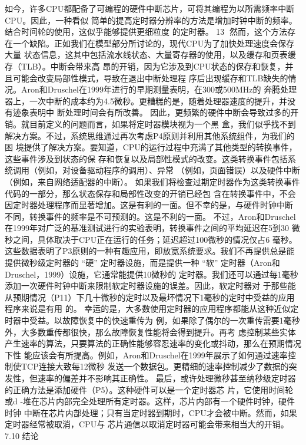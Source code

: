 如今，许多CPU都配备了可编程的硬件中断芯片，可将其编程为以所需频率中断CPU。因此，一种看似
简单的提高定时器分辨率的方法是增加时钟中断的频率。结合时间轮的使用，这似乎能够提供更细粒度
的定时器。
                                                                       13
然而，这个方法存在一个缺陷。正如我们在模型部分所讨论的，现代CPU为了加快处理速度会保存大量
状态信息，这其中包括流水线状态、大量寄存器的使用，以及缓存和页表缓存（TLB）。中断会带来高
昂的开销，因为它涉及到CPU状态的保存和恢复，并且可能会改变局部性模式，导致在退出中断处理程
序后出现缓存和TLB缺失的情况。Aron和Druschel在1999年进行的早期测量表明，在300或500MHz的
奔腾处理器上，一次中断的成本约为4.5微秒。更糟糕的是，随着处理器速度的提升，并没有迹象表明中
断处理时间会有所改善。
因此，更频繁的硬件中断会导致过多的开销。就目前定义的问题而言，如果将定时器模块视为一个黑
盒，我们似乎找不到解决方案。不过，系统思维通过再次考虑P4原则并利用其他系统组件，为我们的困
境提供了解决方案。要知道，CPU的运行过程中充满了其他类型的转换事件，这些事件涉及到状态的保
存和恢复以及局部性模式的改变。这类转换事件包括系统调用（例如，对设备驱动程序的调用）、异常
（例如，页面错误）以及硬件中断（例如，来自网络适配器的中断）。
如果我们将检查过期定时器作为这类转换事件代码的一部分，那么状态保存和局部性改变的开销已经包
含在转换事件中，不会因定时器处理程序而显著增加。这是有利的一面。但不幸的是，与硬件时钟中断
不同，转换事件的频率是不可预测的。这是不利的一面。
不过，Aron和Druschel在1999年对广泛的基准测试进行的实验表明，转换事件之间的平均延迟在5到30
微秒之间，具体取决于CPU正在运行的任务；延迟超过100微秒的情况仅占6%
毫秒。
这些数据表明了P3原则的一种有趣应用，即放宽系统要求。我们不再提供总是能提供微秒级定时器的
“硬” 定时器设施，而是提供一种 “软” 定时器（Aron和Druschel，1999）设施，它通常能提供10微秒的
定时器。我们还可以通过每1毫秒添加一次硬件时钟中断来限制软定时器设施的误差。因此，软定时器对
于那些能从预期情况（P11）下几十微秒的定时以及最坏情况下1毫秒的定时中受益的应用程序来说是有用
的。
幸运的是，大多数使用定时器的应用程序都能从这种近似定时器中受益。以故障恢复中的快速重传为
例，如果除了偶尔的一次重传需要1毫秒外，大多数重传都很快，那么故障恢复性能将会得到提升。再考
虑控制某些实体产生速率的算法，只要算法的正确性能够容忍速率的变化或抖动，那么在预期情况下性
能应该会有所提高。例如，Aron和Druschel在1999年展示了如何通过速率控制使TCP连接大致每12微秒
发送一个数据包。更精细的速率控制减少了数据的突发性，但速率的偏差并不影响其正确性。
最后，或许处理微秒甚至纳秒级定时器的正确方法是添加硬件（P5）。这种硬件可以是一个定时器芯
片，它使用时间轮或d -堆在芯片内部完全处理所有定时器。这样，芯片内部有一个硬件时钟，硬件时钟
中断在芯片内部处理；只有当定时器到期时，CPU才会被中断。然而，如果定时器经常被取消，CPU与
芯片通信以取消定时器可能会带来相当大的开销。
7.10 结论

